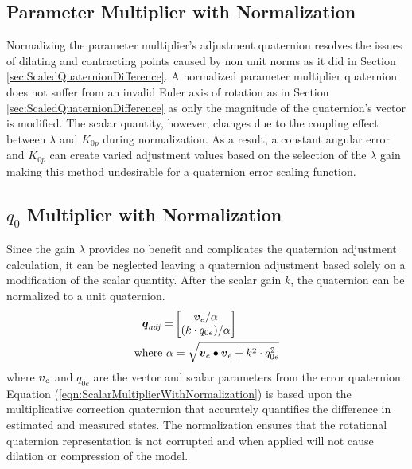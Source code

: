 \subsection{Parameter Multiplier with Normalization}
\label{subsec:ParameterMultiplierwithNormalization}

Normalizing the parameter multiplier's adjustment quaternion resolves the issues of dilating and contracting points caused by non unit norms as it did in Section \ref{sec:ScaledQuaternionDifference}.  A normalized parameter multiplier quaternion does not suffer from an invalid Euler axis of rotation as in Section \ref{sec:ScaledQuaternionDifference} as only the magnitude of the quaternion's vector is modified.  The scalar quantity, however, changes due to the coupling effect between $\lambda$ and $K_{0p}$ during normalization.  As a result, a constant angular error and $K_{0p}$ can create varied adjustment values based on the selection of the $\lambda$ gain making this method undesirable for a quaternion error scaling function.

\subsection{$q_0$ Multiplier with Normalization}
\label{subsec:q0MultiplierWithNormalization}

Since the gain $\lambda$ provides no benefit and complicates the quaternion adjustment calculation, it can be neglected leaving a quaternion adjustment based solely on a modification of the scalar quantity.  After the scalar gain $k$, the quaternion can be normalized to a unit quaternion.
\begin{equation}
  \begin{aligned}
  \boldsymbol{q}_{adj} = & \begin{bmatrix} \boldsymbol{v}_e / \alpha \\ ( k \cdot q_{0e} )  / \alpha \end{bmatrix} \\
  \text{where } \alpha & = \sqrt{\boldsymbol{v}_e \bullet \boldsymbol{v}_e + k^2 \cdot q_{0e}^2}
  \end{aligned}
  \label{eqn:ScalarMultiplierWithNormalization}
\end{equation}
where $\boldsymbol{v}_e$ and $q_{0e}$ are the vector and scalar parameters from the error quaternion.  Equation (\ref{eqn:ScalarMultiplierWithNormalization}) is based upon the multiplicative correction quaternion that accurately quantifies the difference in estimated and measured states.  The normalization ensures that the rotational quaternion representation is not corrupted and when applied will not cause dilation or compression of the model.

